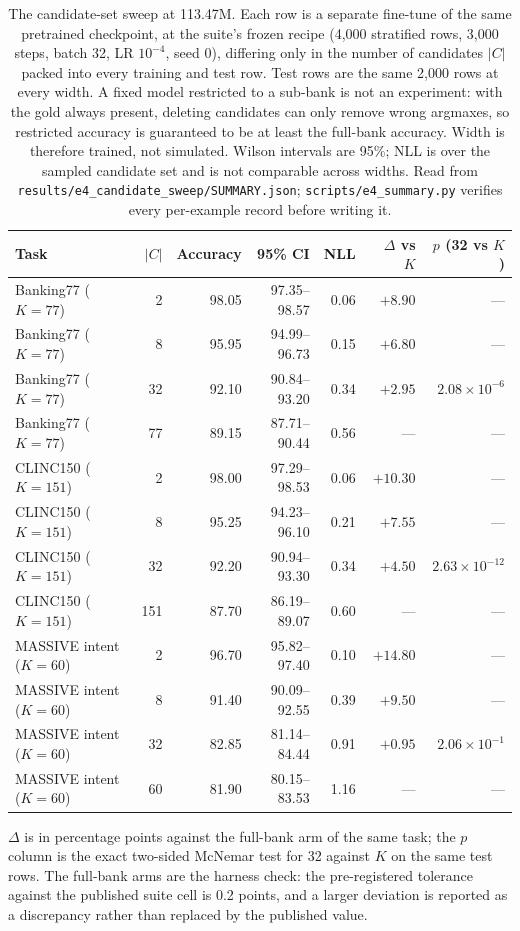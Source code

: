 \begin{table}[htbp]
\centering
\footnotesize
\caption{The candidate-set sweep at 113.47M. Each row is a separate fine-tune of
the same pretrained checkpoint, at the suite's frozen recipe (4{,}000
stratified rows, 3{,}000 steps, batch 32, LR $10^{-4}$, seed 0), differing only
in the number of candidates $|C|$ packed into every training and test row. Test
rows are the same 2{,}000 rows at every width. A fixed model restricted to a
sub-bank is not an experiment: with the gold always present, deleting candidates
can only remove wrong argmaxes, so restricted accuracy is guaranteed to be at
least the full-bank accuracy. Width is therefore trained, not simulated. Wilson
intervals are 95\%; NLL is over the sampled candidate set and is not comparable
across widths. Read from \texttt{results/e4\_candidate\_sweep/SUMMARY.json};
\texttt{scripts/e4\_summary.py} verifies every per-example record before
writing it.}
\label{tab:e4}
\setlength{\tabcolsep}{2.5pt}
\begin{tabular}{@{}lrrrrrr@{}}
\toprule
Task & $|C|$ & Accuracy & 95\% CI & NLL & $\Delta$ vs $K$ & $p$ (32 vs $K$) \\ 
\midrule
Banking77 ($K=77$) & 2 & 98.05 & 97.35--98.57 & 0.06 & $+8.90$ & --- \\
Banking77 ($K=77$) & 8 & 95.95 & 94.99--96.73 & 0.15 & $+6.80$ & --- \\
Banking77 ($K=77$) & 32 & 92.10 & 90.84--93.20 & 0.34 & $+2.95$ & $2.08\times10^{-6}$ \\
Banking77 ($K=77$) & 77 & 89.15 & 87.71--90.44 & 0.56 & --- & --- \\
CLINC150 ($K=151$) & 2 & 98.00 & 97.29--98.53 & 0.06 & $+10.30$ & --- \\
CLINC150 ($K=151$) & 8 & 95.25 & 94.23--96.10 & 0.21 & $+7.55$ & --- \\
CLINC150 ($K=151$) & 32 & 92.20 & 90.94--93.30 & 0.34 & $+4.50$ & $2.63\times10^{-12}$ \\
CLINC150 ($K=151$) & 151 & 87.70 & 86.19--89.07 & 0.60 & --- & --- \\
MASSIVE intent ($K=60$) & 2 & 96.70 & 95.82--97.40 & 0.10 & $+14.80$ & --- \\
MASSIVE intent ($K=60$) & 8 & 91.40 & 90.09--92.55 & 0.39 & $+9.50$ & --- \\
MASSIVE intent ($K=60$) & 32 & 82.85 & 81.14--84.44 & 0.91 & $+0.95$ & $2.06\times10^{-1}$ \\
MASSIVE intent ($K=60$) & 60 & 81.90 & 80.15--83.53 & 1.16 & --- & --- \\
\bottomrule
\end{tabular}
\par\smallskip
\footnotesize
$\Delta$ is in percentage points against the full-bank arm of the same task; the
$p$ column is the exact two-sided McNemar test for 32 against $K$ on the same
test rows. The full-bank arms are the harness check: the pre-registered tolerance against
the published suite cell is 0.2 points, and a larger deviation is reported as a
discrepancy rather than replaced by the published value.
\end{table}
